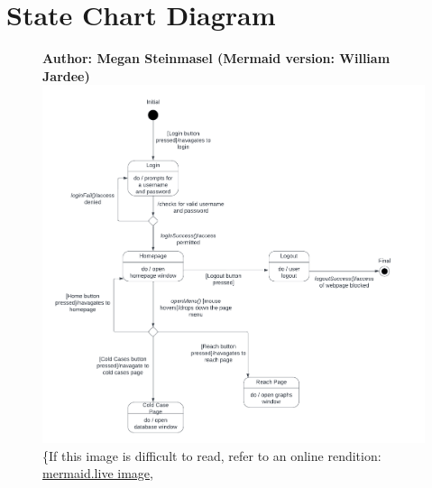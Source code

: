 \documentclass[11pt]{article}
\begin{document}
\section*{State Chart Diagram}

\begin{figure}[!ht]
\centering
\textbf{Author: Megan Steinmasel (Mermaid version: William Jardee)}
	\includegraphics[width=.95\textwidth]{./State Chart/C.C. Statechart}\\
	\{If this image is difficult to read, refer to an online rendition: \href{https://mermaid.ink/img/pako:eNqlVU1vGjEQ_SuWT21EIEBLkr2RD_WSVmrph1TtZVgPu5a8NrK9IBTx3zu2ybJ85VJO3nl-b55nPOaVF0Ygz3ihwLknCaWFOteMfk_g4QEcspwPc86ur3eL2cZ5rKeilpplzKOlBXh0zEXgAtnQ6qbfv6KPgP2WrgFFfIveSlwRXZDInvysS6kRbRBItKQx3AlE8YwVFmNuIsOcQkmga7Hrfp-_lc-YQy0cU6bcJ9-5ax132X9w7qTHXy6S3_JT2ZbV--6vjqjr9MWa8FmADhaY1LlOMrEhHTevKczYtavM-kvI5z58zNjKSHEA_YS5wlPordBBMYD1Zvb9JaHb44yhuPt8MyLqkjVWHYesWR-HCqOauj0ExUGIH2Z96geF9AScxGn_Y9Qg5ITQIoccgQo9nlNLyAUaNY4UtcbCSxPhB2MUgj5Tls6VOq0MdVBDjcfxJRHXxu4TSr0CJcX0MeT7ZrxcbM6Y2g1Uyvi-q-5da21dNnbZWjRHu_3b9eh6aut4AXQerL9gN25IU_JiyjPkVIZY2EP04KCd0fnfc9pGTzWojZPujJ04yO_gNKRSnz8lQabxpw3jPV5TU0EKemej-5z7Cskuz2gpcAGN8jnPddjaLMND-EyX3VieLUA57HFovJltdNEG0q7de91GlQGBxHrlfrMMr3opnSfNwuiFLEOchpjClfdLlw0GAe6X0lfNvF-YeuCkqKiV1ep-MpiMJncwGuPkdgyfx2NRzIf3d4vRp-FC3N4MR8C32x5fgv5rDBnwtqH8GF1_3f2jpKTbf11N_Pk?type=png)](https://mermaid.live/edit#pako:eNqlVU1vGjEQ_SuWT21EIEBLkr2RD_WSVmrph1TtZVgPu5a8NrK9IBTx3zu2ybJ85VJO3nl-b55nPOaVF0Ygz3ihwLknCaWFOteMfk_g4QEcspwPc86ur3eL2cZ5rKeilpplzKOlBXh0zEXgAtnQ6qbfv6KPgP2WrgFFfIveSlwRXZDInvysS6kRbRBItKQx3AlE8YwVFmNuIsOcQkmga7Hrfp-_lc-YQy0cU6bcJ9-5ax132X9w7qTHXy6S3_JT2ZbV--6vjqjr9MWa8FmADhaY1LlOMrEhHTevKczYtavM-kvI5z58zNjKSHEA_YS5wlPordBBMYD1Zvb9JaHb44yhuPt8MyLqkjVWHYesWR-HCqOauj0ExUGIH2Z96geF9AScxGn_Y9Qg5ITQIoccgQo9nlNLyAUaNY4UtcbCSxPhB2MUgj5Tls6VOq0MdVBDjcfxJRHXxu4TSr0CJcX0MeT7ZrxcbM6Y2g1Uyvi-q-5da21dNnbZWjRHu_3b9eh6aut4AXQerL9gN25IU_JiyjPkVIZY2EP04KCd0fnfc9pGTzWojZPujJ04yO_gNKRSnz8lQabxpw3jPV5TU0EKemej-5z7Cskuz2gpcAGN8jnPddjaLMND-EyX3VieLUA57HFovJltdNEG0q7de91GlQGBxHrlfrMMr3opnSfNwuiFLEOchpjClfdLlw0GAe6X0lfNvF-YeuCkqKiV1ep-MpiMJncwGuPkdgyfx2NRzIf3d4vRp-FC3N4MR8C32x5fgv5rDBnwtqH8GF1_3f2jpKTbf11N_Pk}{mermaid.live image}, 

\end{figure}
\end{document}
